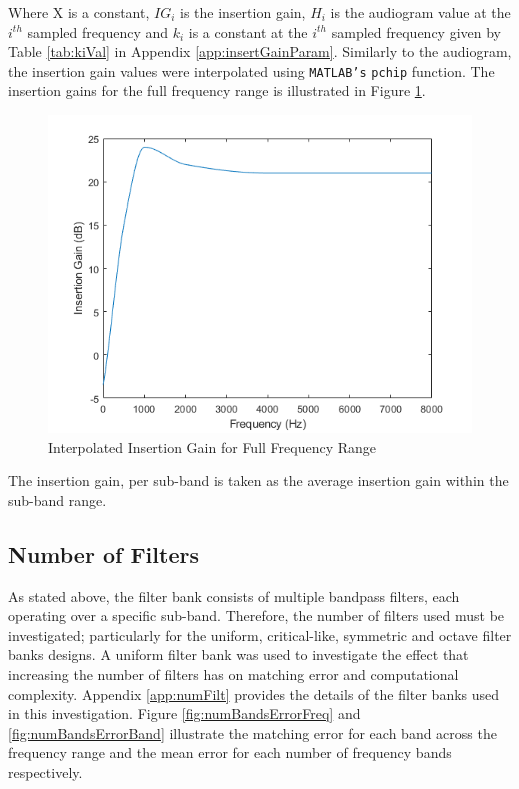 \documentclass[11pt,onecolumn]{witseiepaper}
\begin{document}
\noindent Where X is a constant, $IG_i$ is the insertion gain, $H_i$ is the audiogram value at the $i^{th}$ sampled frequency and $k_i$ is a constant at the $i^{th}$ sampled frequency given by Table \ref{tab:kiVal} in Appendix \ref{app:insertGainParam}. Similarly to the audiogram, the insertion gain values were interpolated using \texttt{MATLAB's} \texttt{pchip} function. The insertion gains for the full frequency range is illustrated in Figure \ref{fig:igFreqRange}.

\begin{figure}[h]
\centering
\includegraphics[width=0.6\linewidth]{igFreqRange.PNG}
\caption{Interpolated Insertion Gain for Full Frequency Range}
\label{fig:igFreqRange}
\end{figure}  

\noindent The insertion gain, per sub-band is taken as the average insertion gain within the sub-band range.

\subsection{Number of Filters} 
\label{sec:numFreqBands}

\noindent As stated above, the filter bank consists of multiple bandpass filters, each operating over a specific sub-band. Therefore, the number of filters used must be investigated; particularly for the uniform, critical-like, symmetric and octave filter banks designs. A uniform filter bank was used to investigate the effect that increasing the number of filters has on matching error and computational complexity. Appendix \ref{app:numFilt} provides the details of the filter banks used in this investigation. Figure \ref{fig:numBandsErrorFreq} and \ref{fig:numBandsErrorBand} illustrate the matching error for each band across the frequency range and the mean error for each number of frequency bands respectively.
\end{document}
